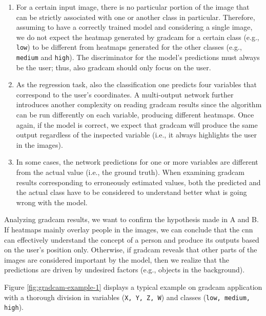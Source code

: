\renewcommand{\labelenumi}{\Alph{enumi}}
\begin{enumerate}
    \item For a certain input image, there is no particular portion of the image that can be strictly associated with one or another class in particular. Therefore, assuming to have a correctly trained model and considering a single image, we do not expect the heatmap generated by \gls{gradcam} for a certain class (e.g., \texttt{low}) to be different from heatmaps generated for the other classes (e.g., \texttt{medium} and \texttt{high}). The discriminator for the model's predictions must always be the user; thus, also \gls{gradcam} should only focus on the user.
    \item As the regression task, also the classification one predicts four variables that correspond to the user's coordinates. A multi-output network further introduces another complexity on reading \gls{gradcam} results since the algorithm can be run differently on each variable, producing different heatmaps. Once again, if the model is correct, we expect that \gls{gradcam} will produce the same output regardless of the inspected variable (i.e., it always highlights the user in the images).
    \item In some cases, the network predictions for one or more variables are different from the actual value (i.e., the ground truth). When examining \gls{gradcam} results corresponding to erroneously estimated values, both the predicted and the actual class have to be considered to understand better what is going wrong with the model.
\end{enumerate}

Analyzing \gls{gradcam} results, we want to confirm the hypothesis made in A and B. If heatmaps mainly overlay people in the images, we can conclude that the \gls{cnn} can effectively understand the concept of a person and produce its outputs based on the user's position only. Otherwise, if \gls{gradcam} reveals that other parts of the images are considered important by the model, then we realize that the predictions are driven by undesired factors (e.g., objects in the background).

\medskip

Figure \ref{fig:gradcam-example-1} displays a typical example on \gls{gradcam} application with a thorough division in variables (\texttt{X, Y, Z, W}) and classes (\texttt{low, medium, high}).

